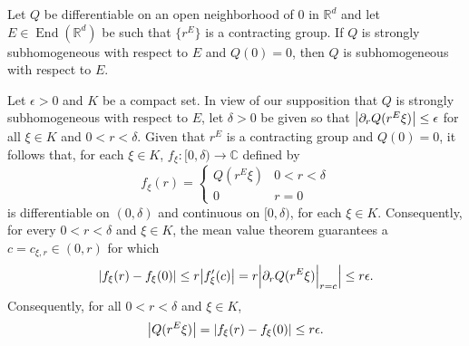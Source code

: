 \documentclass[smallextended]{svjour3}
\theoremstyle{remark}
\renewenvironment{proof}[1][\proofname]{\renewcommand\xproofname{#1}\xproof}{\endxproof}
\newcommand\End{\operatorname{End}} %
\begin{document}
\begin{proposition}\label{prop:supersub_implies_sub}
Let $Q$ be differentiable on an open neighborhood of $0$ in $\mathbb{R}^d$ and let $E\in\End(\mathbb{R}^d)$ be such that $\{r^E\}$ is a contracting group. If $Q$ is strongly subhomogeneous with respect to $E$ and $Q(0)=0$, then $Q$ is subhomogeneous with respect to $E$.
\end{proposition}
\begin{proof}
Let $\epsilon>0$ and $K$ be a compact set.  In view of our supposition that $Q$ is strongly subhomogeneous with respect to $E$, let $\delta>0$ be given so that $\abs{\partial_r Q(r^E\xi)}\leq \epsilon$ for all $\xi\in K$ and $0<r< \delta$. Given that $r^E$ is a contracting group and $Q(0)=0$, it follows that, for each $\xi\in K$, $f_{\xi}:[0,\delta)\to\mathbb{C}$ defined by
\begin{equation*}
f_{\xi}(r)=\begin{cases}
Q(r^E\xi) & 0<r<\delta\\
0 & r=0
\end{cases}
\end{equation*}
is differentiable on $(0,\delta)$ and continuous on $[0,\delta)$, for each $\xi\in K$. Consequently, for every $0<r<\delta$ and $\xi\in K$, the mean value theorem guarantees a $c=c_{\xi,r}\in (0,r)$ for which 
\begin{equation*}
\abs{f_{\xi}(r)-f_{\xi}(0)}\leq r\abs{f_{\xi}'(c)}=r\abs{\partial_r Q(r^E\xi)\Big\vert_{r=c}}\leq r\epsilon.
\end{equation*}
Consequently, for all $0<r<\delta$ and $\xi\in K$,
\begin{equation*}
\abs{Q(r^E\xi)}=\abs{f_{\xi}(r)-f_{\xi}(0)}\leq r\epsilon.
\end{equation*}
\end{proof}
\end{document}
